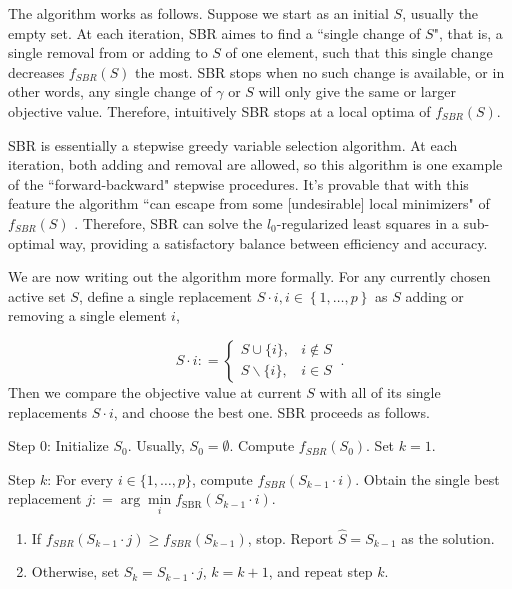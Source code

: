 \documentclass[11pt]{article}%
\numberwithin{equation}{section}
\theoremstyle{plain}
\newcommand{\defeq}{\mathrel{\mathop:}=}
\begin{document}
The algorithm works as follows.  Suppose we start as an initial $S$, usually the empty set.  At each iteration, SBR aimes to find a ``single change of $S$", that is, a single removal from or adding to $S$ of one element, such that this single change decreases $f_{SBR}(S)$ the most.  SBR stops when no such change is available, or in other words, any single change of $\gamma$ or $S$ will only give the same or larger objective value.  Therefore, intuitively SBR stops at a local optima of $f_{SBR}(S)$.

SBR is essentially a stepwise greedy variable selection algorithm.  At each iteration, both adding and removal are allowed, so this algorithm is one example of the ``forward-backward" stepwise procedures.  It's provable that with this feature the algorithm ``can escape from some [undesirable] local minimizers" of $f_{SBR}(S)$ \citep{soussen2015}.  Therefore, SBR can solve the $l_0$-regularized least squares in a sub-optimal way, providing a satisfactory balance between efficiency and accuracy.

We are now writing out the algorithm more formally.  For any currently chosen active set $S$, define a single replacement $S\cdot i, i\in\left\{1, \ldots, p\right\}$ as $S$ adding or removing a single element $i$,

$$
S\cdotp i \defeq
\begin{cases}
S\cup\{i\}, & i\notin S \\
S\backslash \{i\}, & i\in S 
\end{cases} \ .
$$
Then we compare the objective value at current $S$ with all of its single replacements $S\cdot i$, and choose the best one.  SBR proceeds as follows.

\begin{description}
\item Step 0: Initialize $S_0$.  Usually, $S_0 = \emptyset$.  Compute $f_{SBR}(S_0)$.  Set $k = 1$.
\item Step $k$: For every $i \in \{1, \ldots, p\}$, compute $f_{SBR}(S_{k-1} \cdot i)$.  Obtain the single best replacement $j \defeq \arg\min\limits_{i}f_{\text{SBR}}(S_{k-1} \cdot i)$.
\begin{enumerate}
\item If $f_{SBR}(S_{k-1} \cdot j) \geq f_{SBR}(S_{k-1})$, stop. Report $\hat S = S_{k - 1}$ as the solution.
\item Otherwise, set $S_{k} = S_{k-1} \cdot j$, $k = k+1$, and repeat step $k$.
\end{enumerate}
\end{description}
\end{document}
